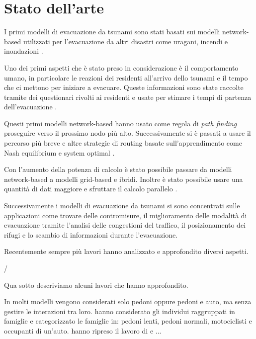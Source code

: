 \section{Stato dell'arte}
\label{sec:stato-arte}
I primi modelli di evacuazione da tsunami sono stati basati sui modelli network-based utilizzati per l'evacuazione da altri disastri come
uragani, incendi e inondazioni \parencite{usuzawa1997development, imamura2001development}.

Uno dei primi aspetti che è stato preso in considerazione è il comportamento umano,
in particolare le reazioni dei residenti all'arrivo dello tsunami
e il tempo che ci mettono per iniziare a evacuare.
%
Queste informazioni sono state raccolte tramite dei questionari rivolti ai residenti
e usate per stimare i tempi di partenza dell'evacuazione \parencite{imamura2001development, saito2004simulation}.

Questi primi modelli network-based hanno usato come regola di \textit{path finding}
proseguire verso il prossimo nodo più alto. %
Successivamente si è passati a usare il percorso
più breve \parencite{katada2004disaster} e altre strategie di routing basate sull'apprendimento 
come Nash equilibrium e system optimal \parencite{lammel2009towards}.

\vspace*{4mm}
Con l'aumento della potenza di calcolo è stato possibile passare da modelli network-based a modelli grid-based e ibridi.
Inoltre è stato possibile usare una quantità di dati maggiore e sfruttare il calcolo parallelo \parencite{wijerathne2013hpc, makinoshima2018enhancing}.

\vspace*{4mm}
Successivamente i modelli di evacuazione da tsunami si sono concentrati sulle applicazioni come trovare delle contromisure, 
il miglioramento delle modalità di evacuazione
tramite l'analisi delle congestioni del traffico, il posizionamento dei rifugi e lo scambio di informazioni durante l'evacuazione.

\parencite{taubenbock2013risk}

\newpage
\noindent
Recentemente sempre più lavori hanno analizzato e approfondito diversi aspetti.

/

\noindent
Qua sotto descriviamo alcuni lavori che hanno approfondito.

\vspace*{4mm}
In molti modelli vengono considerati solo pedoni oppure pedoni e auto, ma senza gestire le interazioni tra loro.
\textcite{goto2012tsunami} hanno considerato gli individui raggruppati in famiglie e categorizzato le famiglie in:
pedoni lenti, pedoni normali, motociclisti e occupanti di un'auto. %
\textcite{wang2021novel} hanno ripreso il lavoro di \textcite{goto2012tsunami} e ...

